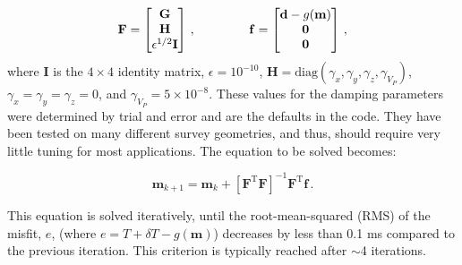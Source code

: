 \begin{equation}
	\mathbf{F} = 
	\left[\begin{matrix}
	\mathbf{G}\\\mathbf{H}\\\epsilon^{1/2}\mathbf{I}
	\end{matrix}\right] \,,
	\hspace{15mm}
	\mathbf{f} = 
	\left[\begin{matrix}
	\mathbf{d} - g(\mathbf{m})\\\mathbf{0}\\\mathbf{0}
	\end{matrix}\right] \,,
\end{equation}
where $\mathbf{I}$ is the $4\times 4$ identity matrix, $\epsilon = 10^{-10}$, $\mathbf{H}=\text{diag}\left( \gamma_{x}, \gamma_{y}, \gamma_{z}, \gamma_{V_P} \right)$, $\gamma_{x}=\gamma_{y}=\gamma_{z}=0$, and $\gamma_{V_P} = 5\times10^{-8}$. These values for the damping parameters were determined by trial and error and are the defaults in the code. They have been tested on many different survey geometries, and thus, should require very little tuning for most applications. The equation to be solved becomes:

\begin{equation}
	\mathbf{m}_{k+1} = \mathbf{m}_k + \left[ \mathbf{F}^{\text{T}} \mathbf{F} \right]^{-1} \mathbf{F}^{\text{T}} \mathbf{f} \,. \label{eq:inverse}
\end{equation}

This equation is solved iteratively, until the root-mean-squared (RMS) of the misfit, $e$, (where $e = T+\delta T-g(\mathbf{m})$) decreases by less than 0.1 ms compared to the previous iteration. This criterion is typically reached after $\sim$4 iterations. 

